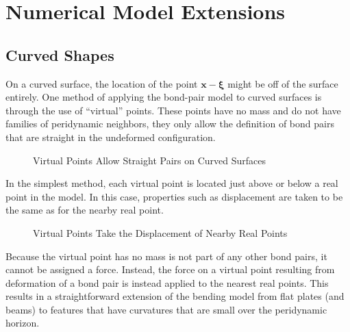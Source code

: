 \section{Numerical Model Extensions}
\subsection{Curved Shapes}
On a curved surface, the location of the point $\mathbf{x} - \boldsymbol{\xi}$ might be off of the surface entirely.
One method of applying the bond-pair model to curved surfaces is through the use of ``virtual'' points.
These points have no mass and do not have families of peridynamic neighbors, they only allow the definition of bond pairs that are straight in the undeformed configuration.
%
\begin{figure}[htbp]
  \vspace{10mm}
  \centering
  
  \caption{Virtual Points Allow Straight Pairs on Curved Surfaces}
  \label{fig:virtualPair}
\end{figure}
%
In the simplest method, each virtual point is located just above or below a real point in the model.
In this case, properties such as displacement are taken to be the same as for the nearby real point.
%
\begin{figure}[htbp]
  \vspace{10mm}
  \centering
  
  \caption{Virtual Points Take the Displacement of Nearby Real Points}
  \label{fig:virtualPairDeformed}
\end{figure}
%
Because the virtual point has no mass is not part of any other bond pairs, it cannot be assigned a force. 
Instead, the force on a virtual point resulting from deformation of a bond pair is instead applied to the nearest real points.
This results in a straightforward extension of the bending model from flat plates (and beams) to features that have curvatures that are small over the peridynamic horizon.

